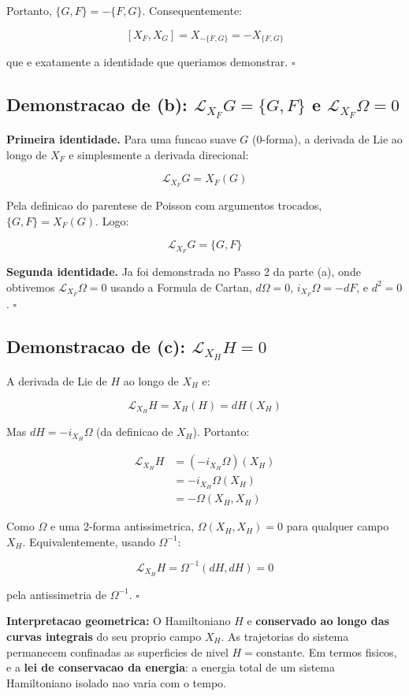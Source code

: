 \documentclass[12pt,a4paper,oneside]{article}
\begin{document}
Portanto, $\{G,F\} = -\{F,G\}$. Consequentemente:

$$[X_F,X_G] = X_{-\{F,G\}} = -X_{\{F,G\}}$$

que e exatamente a identidade que queriamos demonstrar. $\square$

\subsection*{Demonstracao de (b): $\mathcal{L}_{X_F}G = \{G,F\}$ e
$\mathcal{L}_{X_F}\Omega = 0$}

\textbf{Primeira identidade.} Para uma funcao suave $G$ (0-forma), a
derivada de Lie ao longo de $X_F$ e simplesmente a derivada direcional:

$$\mathcal{L}_{X_F}G = X_F(G)$$

Pela definicao do parentese de Poisson com argumentos trocados,
$\{G,F\} = X_F(G)$. Logo:

$$\mathcal{L}_{X_F}G = \{G,F\}$$

\textbf{Segunda identidade.} Ja foi demonstrada no Passo 2 da parte (a),
onde obtivemos $\mathcal{L}_{X_F}\Omega = 0$ usando a Formula de Cartan,
$d\Omega = 0$, $i_{X_F}\Omega = -dF$, e $d^2 = 0$. $\square$

\subsection*{Demonstracao de (c): $\mathcal{L}_{X_H}H = 0$}

A derivada de Lie de $H$ ao longo de $X_H$ e:

$$\mathcal{L}_{X_H}H = X_H(H) = dH(X_H)$$

Mas $dH = -i_{X_H}\Omega$ (da definicao de $X_H$). Portanto:

\begin{align*}
\mathcal{L}_{X_H}H &= (-i_{X_H}\Omega)(X_H) \\
&= -i_{X_H}\Omega(X_H) \\
&= -\Omega(X_H, X_H)
\end{align*}

Como $\Omega$ e uma 2-forma antissimetrica, $\Omega(X_H, X_H) = 0$ para
qualquer campo $X_H$. Equivalentemente, usando $\Omega^{-1}$:

$$\mathcal{L}_{X_H}H = \Omega^{-1}(dH, dH) = 0$$

pela antissimetria de $\Omega^{-1}$. $\square$

\textbf{Interpretacao geometrica:} O Hamiltoniano $H$ e \textbf{conservado
ao longo das curvas integrais} do seu proprio campo $X_H$. As trajetorias
do sistema permanecem confinadas as superficies de nivel $H = \text{constante}$.
Em termos fisicos, e a \textbf{lei de conservacao da energia}: a energia
total de um sistema Hamiltoniano isolado nao varia com o tempo.
\end{document}
